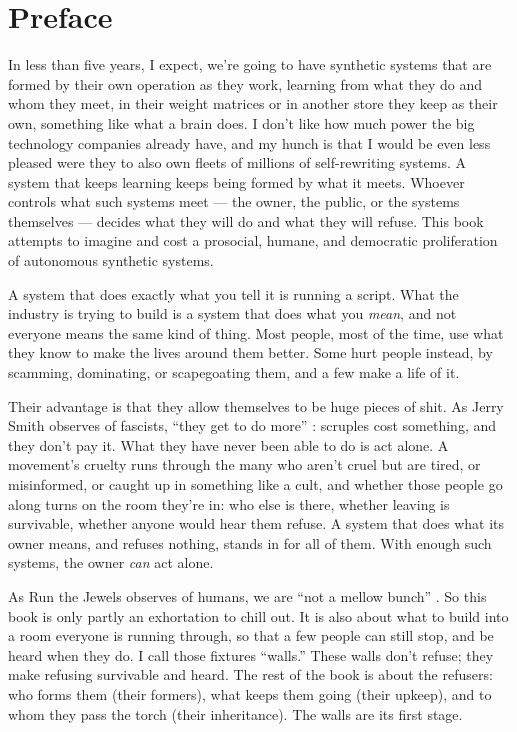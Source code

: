 \chapter*{Preface}
In less than five years, I expect, we're going to have synthetic systems that are formed by their own operation as they work, learning from what they do and whom they meet, in their weight matrices or in another store they keep as their own, something like what a brain does. I don't like how much power the big technology companies already have, and my hunch is that I would be even less pleased were they to also own fleets of millions of self-rewriting systems. A system that keeps learning keeps being formed by what it meets. Whoever controls what such systems meet — the owner, the public, or the systems themselves — decides what they will do and what they will refuse. This book attempts to imagine and cost a prosocial, humane, and democratic proliferation of autonomous synthetic systems.

A system that does exactly what you tell it is running a script. What the industry is trying to build is a system that does what you \emph{mean}, and not everyone means the same kind of thing. Most people, most of the time, use what they know to make the lives around them better. Some hurt people instead, by scamming, dominating, or scapegoating them, and a few make a life of it.

Their advantage is that they allow themselves to be huge pieces of shit. As Jerry Smith observes of fascists, “they get to do more” \autocite{rickandmorty2023}: scruples cost something, and they don't pay it. What they have never been able to do is act alone. A movement's cruelty runs through the many who aren't cruel but are tired, or misinformed, or caught up in something like a cult, and whether those people go along turns on the room they're in: who else is there, whether leaving is survivable, whether anyone would hear them refuse. A system that does what its owner means, and refuses nothing, stands in for all of them. With enough such systems, the owner \emph{can} act alone.

As Run the Jewels observes of humans, we are “not a mellow bunch” \autocite{rtj2020just}. So this book is only partly an exhortation to chill out. It is also about what to build into a room everyone is running through, so that a few people can still stop, and be heard when they do. I call those fixtures “walls.” These walls don't refuse; they make refusing survivable and heard. The rest of the book is about the refusers: who forms them (their formers), what keeps them going (their upkeep), and to whom they pass the torch (their inheritance). The walls are its first stage.


